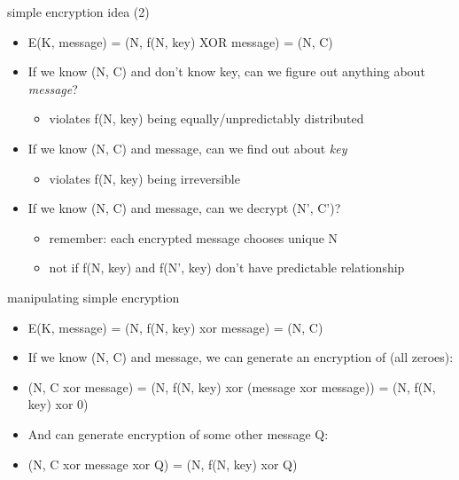 \begin{frame}{simple encryption idea (2)}
    \begin{itemize}
    \item E(K, message) = (N, f(N, key) XOR message) = (N, C)
    \item If we know (N, C) and don't know key,
        can we figure out anything about \textit{message}?
        \begin{itemize}
        \item violates f(N, key) being equally/unpredictably distributed
        \end{itemize}
    \item If we know (N, C) and message, can we find out about \textit{key}
        \begin{itemize}
        \item violates f(N, key) being irreversible
        \end{itemize}
    \item If we know (N, C) and message, can we decrypt (N', C')?
        \begin{itemize}
        \item remember: each encrypted message chooses unique N
        \item not if f(N, key) and f(N', key) don't have predictable relationship
        \end{itemize}
    \end{itemize}
\end{frame}

\begin{frame}{manipulating simple encryption}
    \begin{itemize}
    \item E(K, message) = (N, f(N, key) xor message) = (N, C)
    \item If we know (N, C) and message, we can generate an encryption of (all zeroes):
    \item (N, C xor message) = (N, f(N, key) xor (message xor message)) = (N, f(N, key) xor 0)
    \item And can generate encryption of some other message Q:
    \item (N, C xor message xor Q) = (N, f(N, key) xor Q)
    \end{itemize}
\end{frame}

